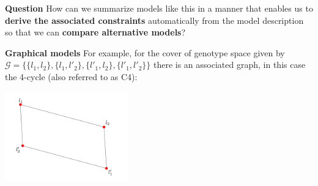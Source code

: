 \begin{frame}
\begin{block}{\textbf{Question}}
How can we summarize models like this in a manner that enables us to \textbf{derive the associated constraints} automatically from the model description so that we can \textbf{compare alternative models}?
\end{block}
\begin{block}{\textbf{Graphical models}}
For example, for the cover of genotype space given by
$\mathcal{G} = \{\{l_1,l_2 \},\{l_1,l'_2 \},\{l'_1,l_2\},\{l'_1,l'_2\} \}$
there is an associated graph, in this case the 4-cycle (also referred to as C4):
\begin{center}
\includegraphics[width=0.4\textwidth]{fig/C4graph_labelled.pdf}
\end{center}
\end{block}
\end{frame}

